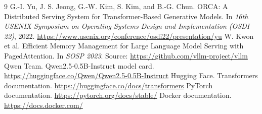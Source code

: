 \documentclass[12pt,a4paper]{article}
\begin{document}
\begin{thebibliography}{9}
 G.-I. Yu, J. S. Jeong, G.-W. Kim, S. Kim, and B.-G. Chun. ORCA: A Distributed Serving System for Transformer-Based Generative Models. In \emph{16th USENIX Symposium on Operating Systems Design and Implementation (OSDI 22)}, 2022. \url{https://www.usenix.org/conference/osdi22/presentation/yu}
 W. Kwon et al. Efficient Memory Management for Large Language Model Serving with PagedAttention. In \emph{SOSP 2023}. Source: \url{https://github.com/vllm-project/vllm}
 Qwen Team. Qwen2.5-0.5B-Instruct model card. \url{https://huggingface.co/Qwen/Qwen2.5-0.5B-Instruct}
 Hugging Face. Transformers documentation. \url{https://huggingface.co/docs/transformers}
 PyTorch documentation. \url{https://pytorch.org/docs/stable/}
 Docker documentation. \url{https://docs.docker.com/}
\end{thebibliography}
\end{document}
